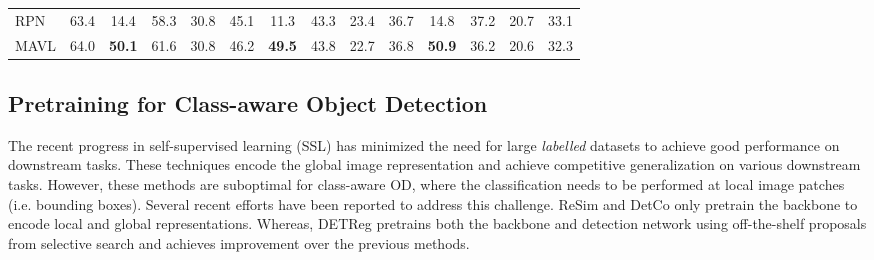 \documentclass[runningheads]{llncs}
\begin{document}
\begin{table*}[!t]
\begin{center}
{\begin{tabular}{l|c|c|ccc|c|ccc|c|ccc}
\hline\hline
RPN & 63.4 & {\cellcolor{orange!6}} 14.4 & 58.3 & 30.8 & 45.1 & {\cellcolor{orange!6}} 11.3 & 43.3 & 23.4 & 36.7 & {\cellcolor{orange!6}} 14.8 & 37.2 & 20.7 & 33.1 \\
MAVL  & 64.0 & {\cellcolor{orange!6}} \textbf{50.1} & 61.6 & 30.8 & 46.2 & {\cellcolor{orange!6}} \textbf{49.5} & 43.8 & 22.7 & 36.8 & {\cellcolor{orange!6}} \textbf{50.9} & 36.2 & 20.6 & 32.3 \\
\bottomrule
\end{tabular}
}
\end{center}
\label{table7:owod}
\end{table*}

\subsection{Pretraining for Class-aware Object Detection}

\begin{wraptable}[8]{r}{6.5cm}
\caption{\small Effect of using MAVL proposals for pre-training of DETReg \cite{detreg} instead of Selective Search \cite{uijlings2013selective} proposals.}
\setlength{\tabcolsep}{4pt}
\label{table10:voc_results}
\end{wraptable}
The recent progress in self-supervised learning (SSL) \cite{PIRL,MoCo,SwAV,barlow_twins} has minimized the need for large \emph{labelled} datasets to achieve good performance on downstream tasks. These techniques encode the global image representation and achieve competitive generalization on various downstream tasks. However, these methods are suboptimal for class-aware OD, where the classification needs to be performed at local image patches (i.e. bounding boxes). Several recent efforts have been reported to address this challenge. ReSim \cite{xiao2021region} and DetCo \cite{xie2021detco} only pretrain the backbone to encode local and global representations. Whereas, DETReg \cite{detreg} pretrains both the backbone and detection network using off-the-shelf proposals from selective search \cite{uijlings2013selective} and achieves improvement over the previous methods. 
\end{document}
